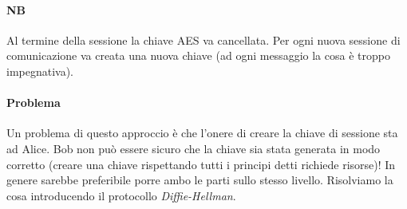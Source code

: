 \paragraph{NB} Al termine della sessione la chiave AES va cancellata. Per ogni nuova sessione di comunicazione va creata una nuova chiave (ad ogni messaggio la cosa è troppo impegnativa).

\paragraph{Problema} Un problema di questo approccio è che l'onere di creare la chiave di sessione sta ad Alice. Bob non può essere sicuro che la chiave sia stata generata in modo corretto (creare una chiave rispettando tutti i principi detti richiede risorse)!
In genere sarebbe preferibile porre ambo le parti sullo stesso livello. Risolviamo la cosa introducendo il protocollo \emph{Diffie-Hellman}.
